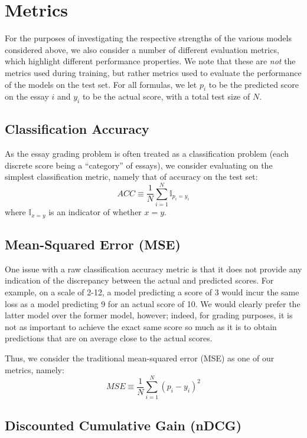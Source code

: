 \documentclass[10pt,psamsfonts]{amsart}
\theoremstyle{definition}
\theoremstyle{remark}
\numberwithin{equation}{section}
\begin{document}
\section*{Metrics}

For the purposes of investigating the respective strengths of the various models considered above, we also consider a number of different evaluation metrics, which highlight different performance properties. We note that these are {\em not} the metrics used during training, but rather metrics used to evaluate the performance of the models on the test set. For all formulas, we let $p_i$ to be the predicted score on the essay $i$ and $y_i$ to be the actual score, with a total test size of $N$.

\subsection*{Classification Accuracy}

As the essay grading problem is often treated as a classification problem (each discrete score being a ``category'' of essays), we consider evaluating on the simplest classification metric, namely that of accuracy on the test set:
$$ACC \equiv \frac{1}{N} \sum_{i=1}^N \mathbb{I}_{p_i = y_i}$$
where $\mathbb{I}_{x=y}$ is an indicator of whether $x=y$.

\subsection*{Mean-Squared Error (MSE)}

One issue with a raw classification accuracy metric is that it does not provide any indication of the discrepancy between the actual and predicted scores. For example, on a scale of 2-12, a model predicting a score of 3 would incur the same loss as a model predicting 9 for an actual score of 10. We would clearly prefer the latter model over the former model, however; indeed, for grading purposes, it is not as important to achieve the exact same score so much as it is to obtain predictions that are on average close to the actual scores.

Thus, we consider the traditional mean-squared error (MSE) as one of our metrics, namely:
$$MSE \equiv \frac{1}{N} \sum_{i=1}^N (p_i - y_i)^2$$

\subsection*{Discounted Cumulative Gain (nDCG)}
\end{document}
